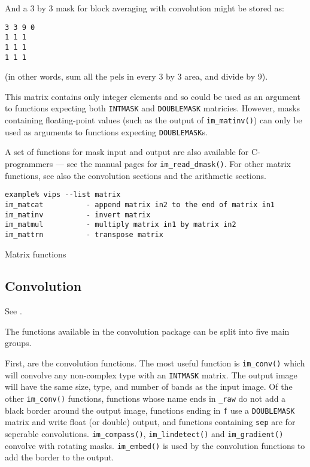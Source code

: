 And a 3 by 3 mask for block averaging with convolution might be stored as:

\begin{verbatim}
3 3 9 0
1 1 1
1 1 1 
1 1 1
\end{verbatim}
  
\noindent
(in other words, sum all the pels in every 3 by 3 area, and divide by 9).

This matrix contains only integer elements and so could be used as an
argument to functions expecting both \verb+INTMASK+ and \verb+DOUBLEMASK+
matricies. However, masks containing floating-point values (such as the
output of \verb+im_matinv()+) can only be used as arguments to functions
expecting \verb+DOUBLEMASK+s.

A set of functions for mask input and output are also available for
C-programmers --- see the manual pages for \verb+im_read_dmask()+. For
other matrix functions, see also the convolution sections and the arithmetic
sections.

\begin{fig2}
\begin{verbatim}
example% vips --list matrix
im_matcat          - append matrix in2 to the end of matrix in1
im_matinv          - invert matrix
im_matmul          - multiply matrix in1 by matrix in2
im_mattrn          - transpose matrix
\end{verbatim}
\caption{Matrix functions}
\label{fg:matricies}
\end{fig2}

\subsection{Convolution}

See .

The functions available in the convolution package can be split into five
main groups.

First, are the convolution functions. The most useful function is
\verb+im_conv()+ which will convolve any non-complex type with an
\verb+INTMASK+ matrix. The output image will have the same size, type, and
number of bands as the input image. Of the other \verb+im_conv()+ functions,
functions whose name ends in \verb+_raw+ do not add a black border around the
output image, functions ending in \verb+f+ use a \verb+DOUBLEMASK+ matrix
and write float (or double) output, and functions containing \verb+sep+
are for seperable convolutions.  \verb+im_compass()+, \verb+im_lindetect()+
and \verb+im_gradient()+ convolve with rotating masks.  \verb+im_embed()+
is used by the convolution functions to add the border to the output.

